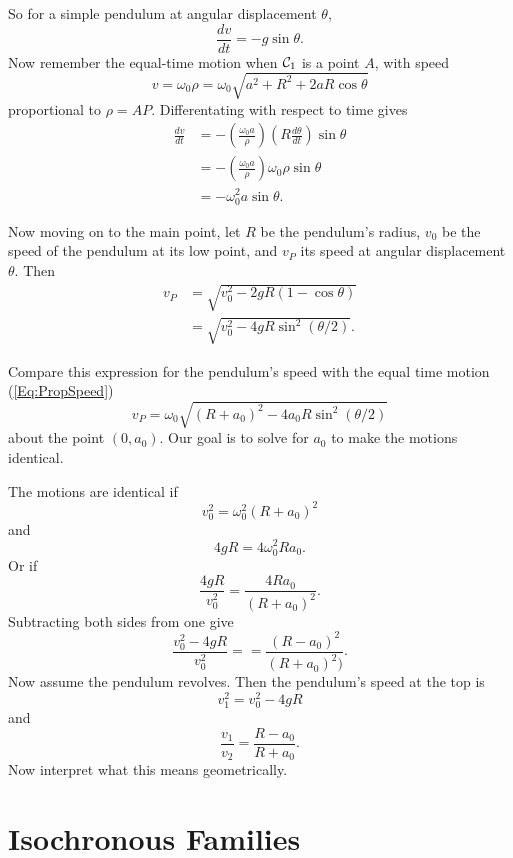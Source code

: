 \documentclass{ximera}
\begin{document}
So for a simple pendulum at angular displacement $\theta$,
\[
   \frac{dv}{dt} = -g\sin\theta .
\]
Now remember the equal-time motion when ${\cal C}_1$ is a point $A$, with speed %
\[
       v = \omega_0 \rho = \omega_0 \sqrt{a^2 + R^2 + 2aR\cos\theta} 
\]
proportional to $\rho = AP$. Differentating with respect to time gives
\begin{align*}
   \frac{dv}{dt} &= - \left( \frac{\omega_0 a}{\rho} \right)\left( R\frac{d\theta}{dt} \right)\sin\theta \\
                       &=  - \left( \frac{\omega_0 a}{\rho} \right) \omega_0 \rho \sin\theta \\
                       &= -\omega_0^2 a \sin\theta .
\end{align*}




Now moving on to the main point, let $R$ be the pendulum's radius, $v_0$ be the speed of the pendulum at its low point, and $v_P$ its speed at angular displacement $\theta$. Then
\begin{align*}
    v_P    &= \sqrt{v_0^2 - 2gR(1-\cos\theta)}  \\
          &= \sqrt{v_0^2 - 4gR\sin^2 (\theta/2)} .
\end{align*}

Compare this expression for the pendulum's speed with the equal time motion (\ref{Eq:PropSpeed}) 
\[
    v_P  = \omega_0 \sqrt{(R+a_0)^2 - 4a_0R\sin^2(\theta/2)}
\]
about the point $(0,a_0)$. Our goal is to solve for $a_0$ to make the motions identical.

The motions are identical if
\[
     v_0^2 = \omega_0^2 (R+a_0)^2  
\]
and
\[
      4gR = 4\omega_0^2 Ra_0 .
\]
Or if
\[
    \frac{4gR}{v_0^2}    = \frac{4Ra_0}{(R+a_0)^2}      .
\]
Subtracting both sides from one give
\[
         \frac{v_0^2 - 4gR}{v_0^2} =  = \frac{(R - a_0)^2}{(R+a_0)^2)}  .
\]
Now assume the pendulum revolves. Then the pendulum's speed at the top is
\[
      v_1^2 = v_0^2 - 4gR 
\]
and
\[
    \frac{v_1}{v_2} = \frac{R-a_0}{R+a_0} .
\]
Now interpret what this means geometrically.



\section*{Isochronous Families}
\end{document}
